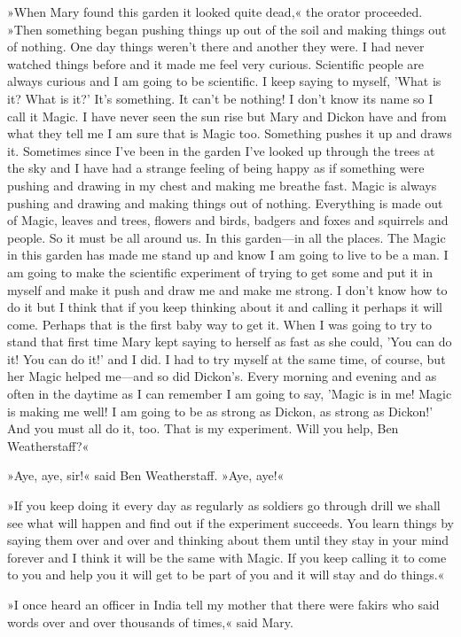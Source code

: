 »When Mary found this garden it looked quite dead,« the orator proceeded. »Then something began pushing things up out of the soil and making things out of nothing. One day things weren't there and another they were. I had never watched things before and it made me feel very curious. Scientific people are always curious and I am going to be scientific. I keep saying to myself, 'What is it? What is it?' It's something. It can't be nothing! I don't know its name so I call it Magic. I have never seen the sun rise but Mary and Dickon have and from what they tell me I am sure that is Magic too. Something pushes it up and draws it. Sometimes since I've been in the garden I've looked up through the trees at the sky and I have had a strange feeling of being happy as if something were pushing and drawing in my chest and making me breathe fast. Magic is always pushing and drawing and making things out of nothing. Everything is made out of Magic, leaves and trees, flowers and birds, badgers and foxes and squirrels and people. So it must be all around us. In this garden—in all the places. The Magic in this garden has made me stand up and know I am going to live to be a man. I am going to make the scientific experiment of trying to get some and put it in myself and make it push and draw me and make me strong. I don't know how to do it but I think that if you keep thinking about it and calling it perhaps it will come. Perhaps that is the first baby way to get it. When I was going to try to stand that first time Mary kept saying to herself as fast as she could, 'You can do it! You can do it!' and I did. I had to try myself at the same time, of course, but her Magic helped me—and so did Dickon's. Every morning and evening and as often in the daytime as I can remember I am going to say, 'Magic is in me! Magic is making me well! I am going to be as strong as Dickon, as strong as Dickon!' And you must all do it, too. That is my experiment. Will you help, Ben Weatherstaff?«

»Aye, aye, sir!« said Ben Weatherstaff. »Aye, aye!«

»If you keep doing it every day as regularly as soldiers go through drill we shall see what will happen and find out if the experiment succeeds. You learn things by saying them over and over and thinking about them until they stay in your mind forever and I think it will be the same with Magic. If you keep calling it to come to you and help you it will get to be part of you and it will stay and do things.«

»I once heard an officer in India tell my mother that there were fakirs who said words over and over thousands of times,« said Mary.

